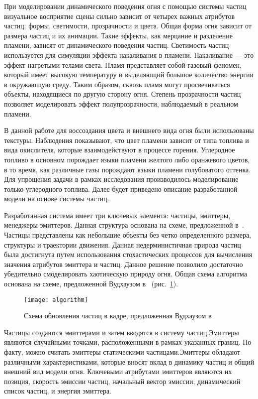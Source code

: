 При моделировании динамического поведения огня с помощью системы частиц
визуальное восприятие сцены сильно зависит от четырех важных атрибутов частиц:
формы, светимости, прозрачности и цвета. Общая форма огня зависит от размера
частиц и их анимации. Такие эффекты, как мерцание и разделение пламени, зависят
от динамического поведения частиц. Светимость частиц используется для симуляции
эффекта накаливания в пламени. Накаливание --- это эффект нагретыми телами
света. Пламя представляет собой газовый феномен, который имеет высокую
температуру и выделяющий большое количество энергии в окружающую среду. Таким
образом, сквозь пламя могут просвечиваться объекты, находящиеся по другую
сторону огня. Степень прозрачности частиц позволяет моделировать эффект
полупрозрачности, наблюдаемый в реальном пламени.

В данной работе для воссоздания цвета и внешнего вида огня были использованы
текстуры. Наблюдения показывают, что цвет пламени зависит от типа топлива и вида
окислителя, которые взаимодействуют в процессе горения. Углеродное топливо в
основном порождает языки пламени желтого либо оранжевого цветов, в то время, как
различные газы порождают языки пламени голубоватого оттенка. Для упрощения
задачи в рамках исследования производилось моделирование только углеродного
топлива. Далее будет приведено описание разработанной модели на основе системы
частиц.

Разработанная система имеет три ключевых элемента: частицы, эмиттеры, менеджеры
эмиттеров. Данная структура основана на схеме, предложенной
в~\cite{Somasekaran2005UsingPS}. Частицы представлены как небольшие объекты без
четко определенного размера, структуры и траектории движения. Данная
недерминистичная природа частиц была достигнута путем использования
стохастических процессов для вычисления значения атрибутов эмиттера и частиц.
Данное решение позволило достаточно убедительно смоделировать хаотическую
природу огня. Общая схема алгоритма основана на схеме, предложенной Вудхаузом
в~\cite{Woodhouse} (рис.~\ref{fig:algorithm}).

\begin{figure}[htb]
	\centering
	\texttt{[image: algorithm]}
    \caption{Схема обновления частиц в кадре, предложенная Вудхаузом
    в~\cite{Woodhouse}}%
    \label{fig:algorithm}
\end{figure}

Частицы создаются эмиттерами и затем вводятся в систему частиц.\break{}Эмиттеры
являются случайными точками, расположенными в рамках указанных границ. По факту,
можно считать эмиттеры статическими частицами.\break{}Эмиттеры обладают
различными характеристиками, которые вносят вклад в динамику частиц и общий
внешний вид модели огня. Ключевыми атрибутами эмиттеров являются их позиция,
скорость эмиссии частиц, начальный вектор эмиссии, динамический список частиц, и
энергия эмиттера.

